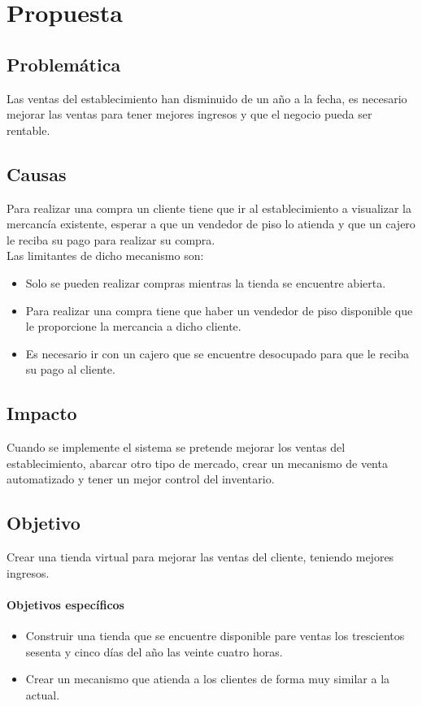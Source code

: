 \chapter{Propuesta}

	\section{Problemática}
	Las ventas del establecimiento han disminuido de un año a la fecha, es necesario mejorar las ventas para tener mejores ingresos y que el negocio pueda ser rentable.

	\section{Causas}
	Para realizar una compra un cliente tiene que ir al establecimiento a visualizar la mercancía existente, esperar a que un vendedor de piso lo atienda y que un cajero le reciba su pago para realizar su compra.\\
	 Las limitantes de dicho mecanismo son:
	 \begin{itemize}
	 	\item Solo se pueden realizar compras mientras la tienda se encuentre abierta.
	 	\item Para realizar una compra tiene que haber un vendedor de piso disponible que le proporcione la mercancia a dicho cliente.
	 	\item Es necesario ir con un cajero que se encuentre desocupado para que le reciba su pago al cliente.
	 \end{itemize}
	
	\section{Impacto}
	Cuando se implemente el sistema se pretende mejorar los ventas del establecimiento, abarcar otro tipo de mercado, crear un mecanismo de venta automatizado y tener un mejor control del inventario.
	
	
	\section{Objetivo}
		Crear una tienda virtual para mejorar las ventas del cliente, teniendo mejores ingresos.
		\subsubsection{Objetivos específicos}
			\begin{itemize}
				\item Construir una tienda que se encuentre disponible pare ventas los trescientos sesenta y cinco días del a\~no las veinte cuatro horas.
				\item Crear un mecanismo que atienda a los clientes de forma muy similar a la actual.
			\end{itemize}
	
